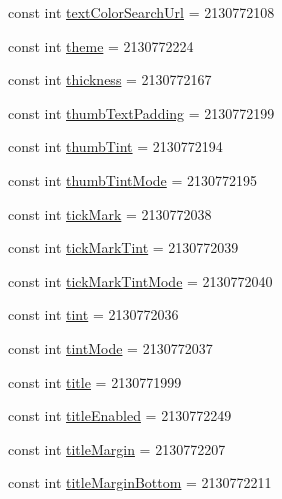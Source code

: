 \begin{CompactItemize}
\item 
const int \hyperlink{class__2doo_1_1_droid_1_1_resource_1_1_attribute_098c57949e30e705fd2008dfaa7f43f1}{textColorSearchUrl} = 2130772108
\item 
const int \hyperlink{class__2doo_1_1_droid_1_1_resource_1_1_attribute_60c10dbe63ccf2da06e13f76723c81ab}{theme} = 2130772224
\item 
const int \hyperlink{class__2doo_1_1_droid_1_1_resource_1_1_attribute_04c4d707b2cdb985a16cb82242514725}{thickness} = 2130772167
\item 
const int \hyperlink{class__2doo_1_1_droid_1_1_resource_1_1_attribute_af17ca18019f381d3b9d21844a07d548}{thumbTextPadding} = 2130772199
\item 
const int \hyperlink{class__2doo_1_1_droid_1_1_resource_1_1_attribute_cc55c8033aacf3ebed0a06e381a91b84}{thumbTint} = 2130772194
\item 
const int \hyperlink{class__2doo_1_1_droid_1_1_resource_1_1_attribute_854e605b8d7aabd36a9af080f3e4cb03}{thumbTintMode} = 2130772195
\item 
const int \hyperlink{class__2doo_1_1_droid_1_1_resource_1_1_attribute_ec1123bc6f3961ecc26950b56df6b396}{tickMark} = 2130772038
\item 
const int \hyperlink{class__2doo_1_1_droid_1_1_resource_1_1_attribute_19f2c636f5cad21c525a5e9672103885}{tickMarkTint} = 2130772039
\item 
const int \hyperlink{class__2doo_1_1_droid_1_1_resource_1_1_attribute_05f358756dd64d7f7a322a8cde068530}{tickMarkTintMode} = 2130772040
\item 
const int \hyperlink{class__2doo_1_1_droid_1_1_resource_1_1_attribute_84a957fe8d6d8c9c2460e5628806a71f}{tint} = 2130772036
\item 
const int \hyperlink{class__2doo_1_1_droid_1_1_resource_1_1_attribute_212dde6e9cdaec5a7901a4207ee6af1a}{tintMode} = 2130772037
\item 
const int \hyperlink{class__2doo_1_1_droid_1_1_resource_1_1_attribute_bb3c22ed61e913c53f7cc478173c5b74}{title} = 2130771999
\item 
const int \hyperlink{class__2doo_1_1_droid_1_1_resource_1_1_attribute_c6c5b6bc2e83a1258382c4afa60edb51}{titleEnabled} = 2130772249
\item 
const int \hyperlink{class__2doo_1_1_droid_1_1_resource_1_1_attribute_6040c6dc4b777edf723609c908da8a76}{titleMargin} = 2130772207
\item 
const int \hyperlink{class__2doo_1_1_droid_1_1_resource_1_1_attribute_7059f1dadd9574d512669b5cc611fc40}{titleMarginBottom} = 2130772211

\end{CompactItemize}
